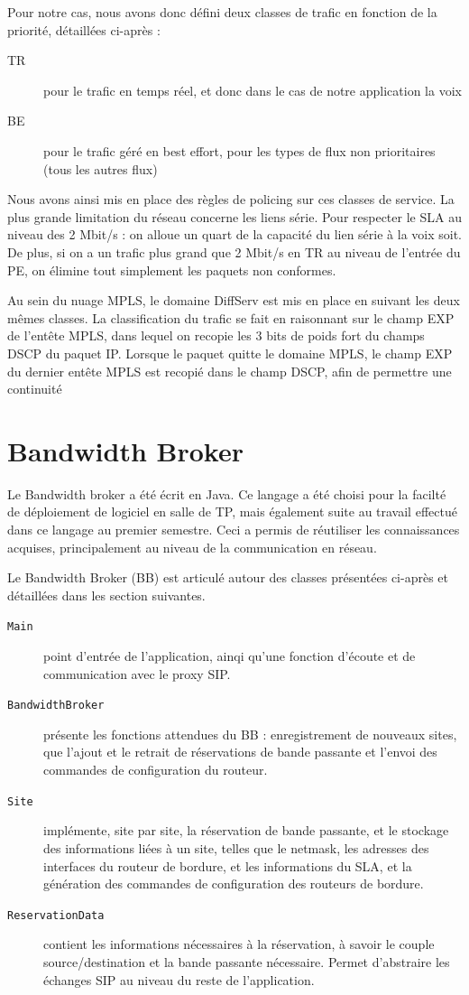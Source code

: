 \documentclass[a4paper,11pt]{article}
\let\Oldsection\section
\renewcommand{\section}{\FloatBarrier\Oldsection}
\begin{document}
Pour notre cas, nous avons donc défini deux classes de trafic en fonction de la priorité, détaillées ci-après : 
\begin{description}
    \item[TR] pour le trafic en temps réel, et donc dans le cas de notre application la voix
    \item[BE] pour le trafic géré en best effort, pour les types de flux non prioritaires (tous les autres flux)
\end{description}

Nous avons ainsi mis en place des règles de policing sur ces classes de service. La plus grande limitation du réseau concerne les liens série. Pour respecter le SLA au niveau des 2 Mbit/s : on alloue un quart de la capacité du lien série à la voix soit. De plus, si on a un trafic plus grand que 2 Mbit/s en TR au niveau de l'entrée du PE, on élimine tout simplement les paquets non conformes. 

Au sein du nuage MPLS, le domaine DiffServ est mis en place en suivant les deux mêmes classes. La classification du trafic se fait en raisonnant sur le champ EXP de l’entête MPLS, dans lequel on recopie les 3 bits de poids fort du champs DSCP du paquet IP. Lorsque le paquet quitte le domaine MPLS, le champ EXP du dernier entête MPLS est recopié dans le champ DSCP, afin de permettre une continuité


\section{Bandwidth Broker}
\label{sec:BB}
Le Bandwidth broker a été écrit en Java. Ce langage a été choisi pour la facilté de déploiement de logiciel en salle de TP, mais également suite au travail effectué dans ce langage au premier semestre. Ceci a permis de réutiliser les connaissances acquises, principalement au niveau de la communication en réseau.

Le Bandwidth Broker (BB) est articulé autour des classes présentées ci-après et détaillées dans les section suivantes.

\begin{description}
    \item[\texttt{Main}] point d'entrée de l'application, ainqi qu'une fonction d'écoute et de communication avec le proxy SIP.
    \item[\texttt{BandwidthBroker}] présente les fonctions attendues du BB : enregistrement de nouveaux sites, que l'ajout et le retrait de réservations de bande passante et l'envoi des commandes de configuration du routeur.
    \item[\texttt{Site}] implémente, site par site, la réservation de bande passante, et le stockage des informations liées à un site, telles que le netmask, les adresses des interfaces du routeur de bordure, et les informations du SLA, et la génération des commandes de configuration des routeurs de bordure.
    \item[\texttt{ReservationData}] contient les informations nécessaires à la réservation, à savoir le couple source\slash destination et la bande passante nécessaire. Permet d'abstraire les échanges SIP au niveau du reste de l'application.
\end{description}
\end{document}
